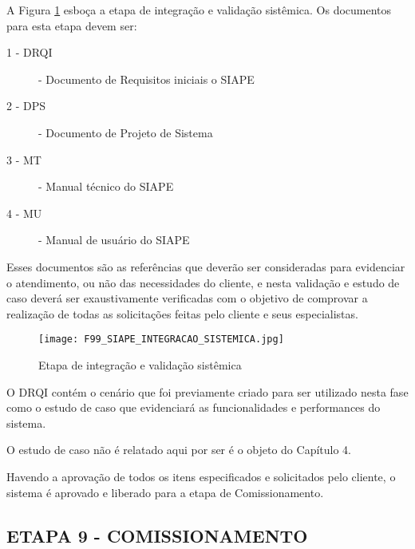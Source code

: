 A Figura \ref{F99} esboça a etapa de integração e validação sistêmica. Os documentos para esta etapa devem ser: 

\begin{description}
	\item[1 - DRQI] -  Documento de Requisitos iniciais o SIAPE
	\item[2 - DPS] - Documento de Projeto de Sistema
	\item[3 - MT] - Manual técnico do SIAPE
	\item[4 - MU] - Manual de usuário do SIAPE
\end{description}
	
Esses documentos são as referências que deverão ser consideradas para evidenciar o atendimento, ou não das necessidades do cliente, e nesta validação e estudo de caso deverá ser exaustivamente verificadas com o objetivo de comprovar a realização de todas as solicitações feitas pelo cliente e seus especialistas.
	
\begin{figure}[h]
	\centering
	\texttt{[image: F99\_SIAPE\_INTEGRACAO\_SISTEMICA.jpg]} 
	\caption{Etapa de integração e validação sistêmica}
	\label{F99}
\end{figure}

O DRQI contém o cenário que foi previamente criado para ser utilizado nesta fase como o estudo de caso que evidenciará as funcionalidades e performances do sistema.

O estudo de caso não é relatado aqui por ser é o objeto do Capítulo  4.     

Havendo a aprovação de todos os itens especificados e solicitados pelo cliente, o sistema é aprovado e liberado para a etapa de Comissionamento.


\clearpage

\subsection{ETAPA 9 - COMISSIONAMENTO}

